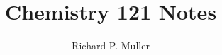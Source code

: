 \documentclass{report}
\begin{document}
\title{Chemistry 121 Notes}
\author{Richard P. Muller}
\maketitle














\end{document}

